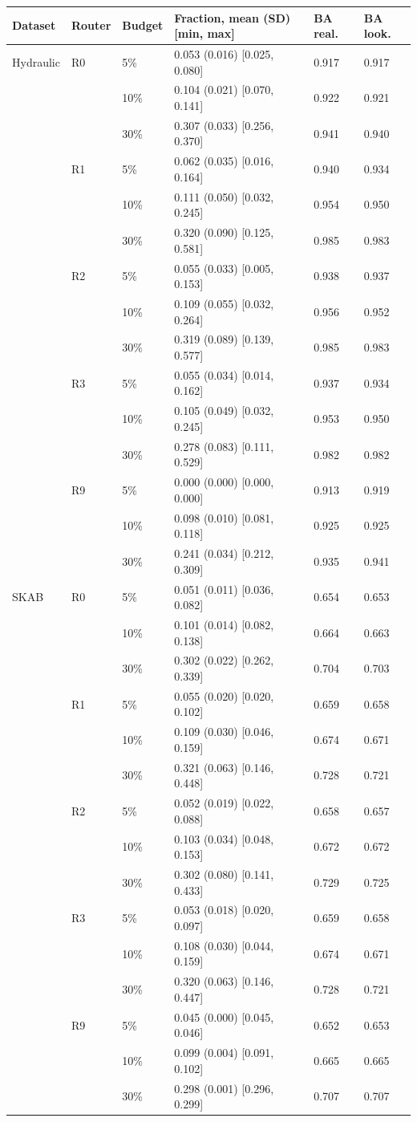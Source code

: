\begin{tabular}{@{}l l l lll@{}}
\toprule
Dataset & Router & Budget & Fraction, mean (SD) [min, max] & BA real. & BA look. \\
\midrule
Hydraulic & R0 & 5\% & 0.053 (0.016) [0.025, 0.080] & 0.917 & 0.917 \\
 &  & 10\% & 0.104 (0.021) [0.070, 0.141] & 0.922 & 0.921 \\
 &  & 30\% & 0.307 (0.033) [0.256, 0.370] & 0.941 & 0.940 \\
 & R1 & 5\% & 0.062 (0.035) [0.016, 0.164] & 0.940 & 0.934 \\
 &  & 10\% & 0.111 (0.050) [0.032, 0.245] & 0.954 & 0.950 \\
 &  & 30\% & 0.320 (0.090) [0.125, 0.581] & 0.985 & 0.983 \\
 & R2 & 5\% & 0.055 (0.033) [0.005, 0.153] & 0.938 & 0.937 \\
 &  & 10\% & 0.109 (0.055) [0.032, 0.264] & 0.956 & 0.952 \\
 &  & 30\% & 0.319 (0.089) [0.139, 0.577] & 0.985 & 0.983 \\
 & R3 & 5\% & 0.055 (0.034) [0.014, 0.162] & 0.937 & 0.934 \\
 &  & 10\% & 0.105 (0.049) [0.032, 0.245] & 0.953 & 0.950 \\
 &  & 30\% & 0.278 (0.083) [0.111, 0.529] & 0.982 & 0.982 \\
 & R9 & 5\% & 0.000 (0.000) [0.000, 0.000] & 0.913 & 0.919 \\
 &  & 10\% & 0.098 (0.010) [0.081, 0.118] & 0.925 & 0.925 \\
 &  & 30\% & 0.241 (0.034) [0.212, 0.309] & 0.935 & 0.941 \\
\addlinespace
SKAB & R0 & 5\% & 0.051 (0.011) [0.036, 0.082] & 0.654 & 0.653 \\
 &  & 10\% & 0.101 (0.014) [0.082, 0.138] & 0.664 & 0.663 \\
 &  & 30\% & 0.302 (0.022) [0.262, 0.339] & 0.704 & 0.703 \\
 & R1 & 5\% & 0.055 (0.020) [0.020, 0.102] & 0.659 & 0.658 \\
 &  & 10\% & 0.109 (0.030) [0.046, 0.159] & 0.674 & 0.671 \\
 &  & 30\% & 0.321 (0.063) [0.146, 0.448] & 0.728 & 0.721 \\
 & R2 & 5\% & 0.052 (0.019) [0.022, 0.088] & 0.658 & 0.657 \\
 &  & 10\% & 0.103 (0.034) [0.048, 0.153] & 0.672 & 0.672 \\
 &  & 30\% & 0.302 (0.080) [0.141, 0.433] & 0.729 & 0.725 \\
 & R3 & 5\% & 0.053 (0.018) [0.020, 0.097] & 0.659 & 0.658 \\
 &  & 10\% & 0.108 (0.030) [0.044, 0.159] & 0.674 & 0.671 \\
 &  & 30\% & 0.320 (0.063) [0.146, 0.447] & 0.728 & 0.721 \\
 & R9 & 5\% & 0.045 (0.000) [0.045, 0.046] & 0.652 & 0.653 \\
 &  & 10\% & 0.099 (0.004) [0.091, 0.102] & 0.665 & 0.665 \\
 &  & 30\% & 0.298 (0.001) [0.296, 0.299] & 0.707 & 0.707 \\
\bottomrule
\end{tabular}

